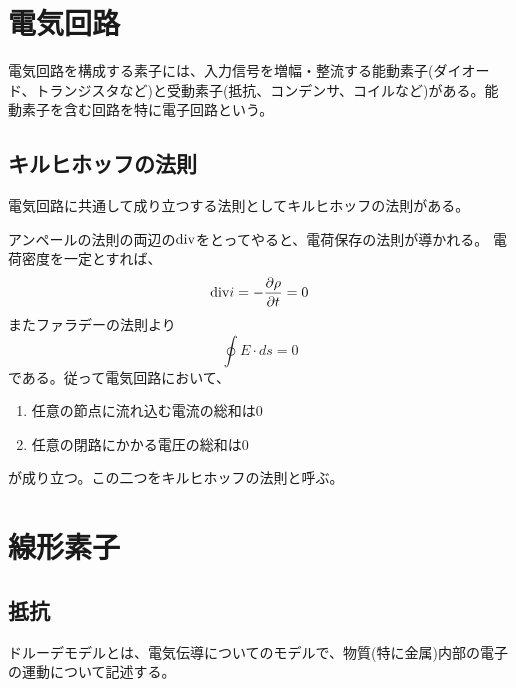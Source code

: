 
\section{電気回路}
    電気回路を構成する素子には、入力信号を増幅・整流する能動素子(ダイオード、トランジスタなど)と受動素子(抵抗、コンデンサ、コイルなど)がある。能動素子を含む回路を特に電子回路という。
    \subsection{キルヒホッフの法則}
        電気回路に共通して成り立つする法則としてキルヒホッフの法則がある。

        アンペールの法則の両辺の$\dive$をとってやると、電荷保存の法則が導かれる。
        電荷密度を一定とすれば、
            \[\dive i = -\pd[\rho]{t} = 0\]
        またファラデーの法則より
            \[\oint E\cdot ds = 0\]
        である。従って電気回路において、
        \begin{enumerate}
            \item 任意の節点に流れ込む電流の総和は0
            \item 任意の閉路にかかる電圧の総和は0
        \end{enumerate}
        が成り立つ。この二つをキルヒホッフの法則と呼ぶ。

\section{線形素子}
    \subsection{抵抗}
        ドルーデモデルとは、電気伝導についてのモデルで、物質(特に金属)内部の電子の運動について記述する。

